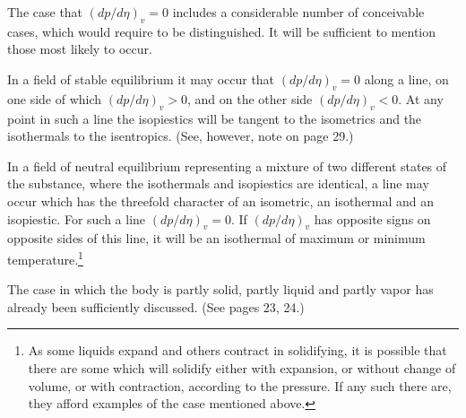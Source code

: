 \documentclass[11pt]{article}
\begin{document}
\begin{figure}[h]
\centering
{}
\end{figure}

The case that $\left(dp/d\eta\right)_v=0$ includes a considerable number of conceivable cases, which would require to be distinguished. It will be sufficient to mention those most likely to occur.

In a field of stable equilibrium it may occur that $\left(dp/d\eta\right)_v=0$ along a line, on one side of which $\left(dp/d\eta\right)_v>0$, and on the other side $\left(dp/d\eta\right)_v<0$. At any point in such a line the isopiestics will be tangent to the isometrics and the isothermals to the isentropics. (See, however, note on page 29.)

In a field of neutral equilibrium representing a mixture of two different states of the substance, where the isothermals and isopiestics are identical, a line may occur which has the threefold character of an isometric, an isothermal and an isopiestic. For such a line $\left(dp/d\eta\right)_v=0$. If $\left(dp/d\eta\right)_v$ has opposite signs on opposite sides of this line, it will be an isothermal of maximum or minimum temperature.\footnote{As some liquids expand and others contract in solidifying, it is possible that there are some which will solidify either with expansion, or without change of volume, or with contraction, according to the pressure. If any such there are, they afford examples of the case mentioned above.}

The case in which the body is partly solid, partly liquid and partly vapor has already been sufficiently discussed. (See pages 23, 24.)
\end{document}
